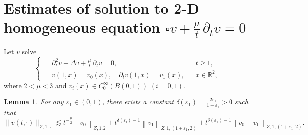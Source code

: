 \documentclass[11pt,twoside]{article}
\newcommand{\R}{\mathbb R}
\newcommand{\p}{\partial}
\newcommand{\ve}{\varepsilon}
\newcommand{\f}{\frac}
\theoremstyle{plain}
\newtheorem{lemma}[theorem]{Lemma}
\theoremstyle{definition}
\theoremstyle{remark}
\numberwithin{equation}{section}
\begin{document}
\section{Estimates of solution to 2-D homogeneous equation $\square v+\f{\mu}{t}\,\p_tv=0$}\label{sec3}

Let $v$ solve
\begin{equation}\label{equ:q16}
\left\{ \enspace
\begin{aligned}
&\partial_t^2 v-\Delta v +\f{\mu}{t}\,\p_tv=0, &&
t\geq 1,\\
&v(1,x)=v_0(x), \quad \partial_{t} v(1,x)=v_1(x), &&x\in\R^2,
\end{aligned}
\right.
\end{equation}
where $2<\mu<3$ and $v_i(x)\in C_0^{\infty}(B(0, 1))$ $(i=0, 1)$.
\begin{lemma}\label{lem2}
For any $\varepsilon_1\in(0, 1)$, there exists a constant $\delta(\varepsilon_1)=\f{2\ve_1}{1+\varepsilon_1}>0$ such that
\begin{equation}\label{equ:q17}
\|v(t, \cdot)\|_{Z, 1, 2} \lesssim t^{-\f{\mu}{2}}\left\|v_0\right\|_{Z, 1, 2}
+t^{\delta(\varepsilon_1)-1}\left\|v_1\right\|_{Z, 1,(1+\varepsilon_1, 2)}
+t^{\delta(\varepsilon_1)-1}\left\|v_0+v_1\right\|_{Z, 1,(1+\varepsilon_1, 2)}.
\end{equation}
\end{lemma}
\end{document}
